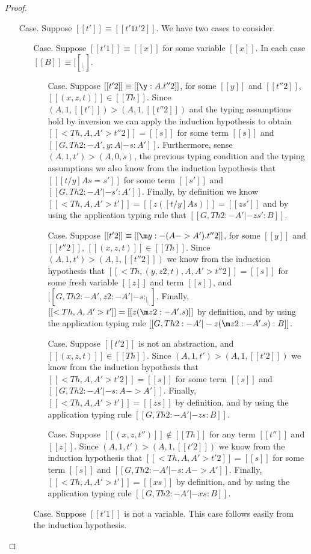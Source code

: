 \begin{proof}
\begin{itemize}
  \item[Case.] Suppose $[[t']] \equiv [[t'1 t'2]]$. We have two cases to consider.
    \begin{itemize}
    \item[Case.] Suppose $[[t'1]] \equiv [[x]]$ for some variable $[[x]]$.  In each
      case $[[B]] \equiv [[_|_]]$.
      \begin{itemize}
      \item[Case.] Suppose $[[t'2]] \equiv [[\y:A.t''2]]$, for some $[[y]]$ and $[[t''2]]$,
        $[[(x,z,t)]] \in [[Th]]$. Since 
        $(A,1,[[t']]) > (A,1,[[t''2]])$ and the typing assumptions
        hold by inversion we can apply the induction
        hypothesis to obtain $[[<Th,A,A'>t''2]] = [[s]]$ for some term $[[s]]$ and
        $[[G,Th 2:{-A'},y:A |- s : A']]$.
        Furthermore, sense $(A,1,t') > (A,0,s)$, the previous typing condition and
        the typing assumptions we also know from the induction hypothesis that 
        $[[ [t/y] A s = s' ]]$ for some term $[[s']]$ and
        $[[G,Th 2:{-A'} |- s' : A']]$. Finally, by definition we know 
        $[[<Th, A, A'>t']] = [[z ([t/y] A s)]] = [[z s']]$ and 
        by using the application typing rule that $[[G,Th 2:{-A'} |- z s' : B]]$.

      \item[Case.] Suppose $[[t'2]] \equiv [[\m y:{-(A->A')}.t''2]]$, for some $[[y]]$ and 
        $[[t''2]]$, $[[(x,z,t)]] \in [[Th]]$. Since $(A,1,t') > (A,1,[[t''2]])$ we know from the 
        induction hypothesis that $[[<Th,(y,z2,t),A,A'>t''2]] = [[s]]$ for some fresh variable $[[z]]$
        and term $[[s]]$, and $[[G,Th 2:{-A'},z2:{-A'} |- s : _|_ ]]$.
        Finally, $[[<Th, A,A'>t']] = [[z (\m z2:{-A'}.s)]]$ by definition, and by
        using the application typing rule 
        $[[G,Th 2:{-A'} |- z (\m z2:{-A'}.s) : B ]]$.

      \item[Case.] Suppose $[[t'2]]$ is not an abstraction, and $[[(x,z,t)]] \in [[Th]]$.  
        Since $(A,1,t') > (A,1,[[t'2]])$ we know from the 
        induction hypothesis that $[[<Th,A,A'>t'2]] = [[s]]$ for some term $[[s]]$
        and $[[G,Th 2:{-A'} |- s : A -> A' ]]$.  Finally,
        $[[<Th, A,A'>t']] = [[z s]]$ by definition, and by
        using the application typing rule 
        $[[G,Th 2:{-A'} |- z s : B ]]$.

      \item[Case.] Suppose $[[(x,z,t'')]] \not \in [[Th]]$ for any term $[[t'']]$ and $[[z]]$.  
        Since $(A,1,t') > (A,1,[[t'2]])$ we know from the 
        induction hypothesis that $[[<Th,A,A'>t'2]] = [[s]]$ for some term $[[s]]$
        and $[[G,Th 2:{-A'} |- s : A -> A' ]]$.  Finally,
        $[[<Th, A,A'>t']] = [[x s]]$ by definition, and by
        using the application typing rule 
        $[[G,Th 2:{-A'} |- x s : B ]]$.
      \end{itemize}
    \item[Case.] Suppose $[[t'1]]$ is not a variable.  This case follows easily from
      the induction hypothesis.
    \end{itemize}


\end{itemize}
\end{proof}
